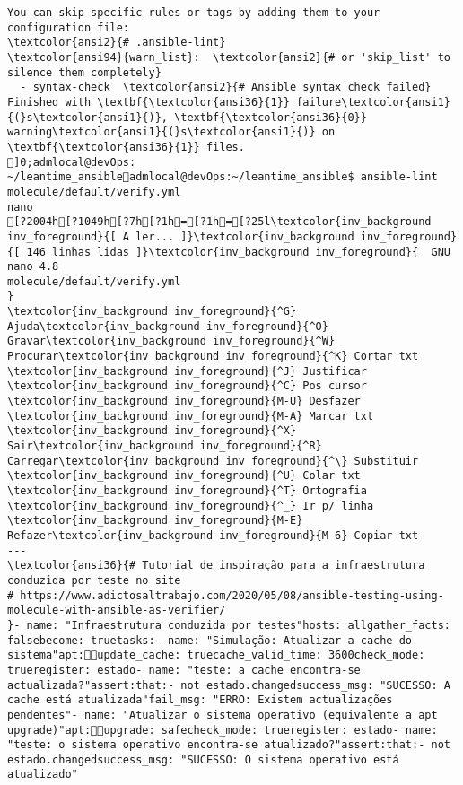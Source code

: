 \documentclass{scrartcl}
\begin{document}
\begin{Verbatim}
You can skip specific rules or tags by adding them to your configuration file:
\textcolor{ansi2}{# .ansible-lint}
\textcolor{ansi94}{warn_list}:  \textcolor{ansi2}{# or 'skip_list' to silence them completely}
  - syntax-check  \textcolor{ansi2}{# Ansible syntax check failed}
Finished with \textbf{\textcolor{ansi36}{1}} failure\textcolor{ansi1}{(}s\textcolor{ansi1}{)}, \textbf{\textcolor{ansi36}{0}} warning\textcolor{ansi1}{(}s\textcolor{ansi1}{)} on \textbf{\textcolor{ansi36}{1}} files.
]0;admlocal@devOps: ~/leantime_ansibleadmlocal@devOps:~/leantime_ansible$ ansible-lint molecule/default/verify.yml 
nano
[?2004h[?1049h[?7h[?1h=[?1h=[?25l\textcolor{inv_background inv_foreground}{[ A ler... ]}\textcolor{inv_background inv_foreground}{[ 146 linhas lidas ]}\textcolor{inv_background inv_foreground}{  GNU nano 4.8                                          molecule/default/verify.yml                                                       }
\textcolor{inv_background inv_foreground}{^G} Ajuda\textcolor{inv_background inv_foreground}{^O} Gravar\textcolor{inv_background inv_foreground}{^W} Procurar\textcolor{inv_background inv_foreground}{^K} Cortar txt    \textcolor{inv_background inv_foreground}{^J} Justificar    \textcolor{inv_background inv_foreground}{^C} Pos cursor    \textcolor{inv_background inv_foreground}{M-U} Desfazer     \textcolor{inv_background inv_foreground}{M-A} Marcar txt
\textcolor{inv_background inv_foreground}{^X} Sair\textcolor{inv_background inv_foreground}{^R} Carregar\textcolor{inv_background inv_foreground}{^\} Substituir    \textcolor{inv_background inv_foreground}{^U} Colar txt     \textcolor{inv_background inv_foreground}{^T} Ortografia    \textcolor{inv_background inv_foreground}{^_} Ir p/ linha   \textcolor{inv_background inv_foreground}{M-E} Refazer\textcolor{inv_background inv_foreground}{M-6} Copiar txt
---
\textcolor{ansi36}{# Tutorial de inspiração para a infraestrutura conduzida por teste no site
# https://www.adictosaltrabajo.com/2020/05/08/ansible-testing-using-molecule-with-ansible-as-verifier/
}- name: "Infraestrutura conduzida por testes"hosts: allgather_facts: falsebecome: truetasks:- name: "Simulação: Atualizar a cache do sistema"apt:update_cache: truecache_valid_time: 3600check_mode: trueregister: estado- name: "teste: a cache encontra-se actualizada?"assert:that:- not estado.changedsuccess_msg: "SUCESSO: A cache está atualizada"fail_msg: "ERRO: Existem actualizações pendentes"- name: "Atualizar o sistema operativo (equivalente a apt upgrade)"apt:upgrade: safecheck_mode: trueregister: estado- name: "teste: o sistema operativo encontra-se atualizado?"assert:that:- not estado.changedsuccess_msg: "SUCESSO: O sistema operativo está atualizado"

\end{Verbatim}
\end{document}

